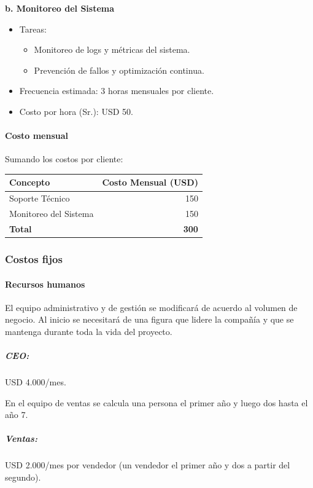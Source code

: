 \textbf{b. Monitoreo del Sistema}
\begin{itemize}
    \item Tareas:
    \begin{itemize}
        \item Monitoreo de logs y métricas del sistema.
        \item Prevención de fallos y optimización continua.
    \end{itemize}
    \item Frecuencia estimada: 3 horas mensuales por cliente.
    \item Costo por hora (Sr.): USD 50.
\end{itemize}

\paragraph{Costo mensual}

Sumando los costos por cliente:

\begin{center}
\begin{tabular}{lr}
\hline
\textbf{Concepto} & \textbf{Costo Mensual (USD)} \\
\hline
Soporte Técnico & 150 \\
Monitoreo del Sistema & 150 \\
\hline
\textbf{Total} & \textbf{300} \\
\hline
\end{tabular}
\end{center}

\subsubsection{Costos fijos}

\paragraph{Recursos humanos}

El equipo administrativo y de gestión se modificará de acuerdo al volumen de negocio. Al inicio se necesitará de una figura que lidere la compañía y que se mantenga durante toda la vida del proyecto.

\subparagraph{CEO:} USD 4.000/mes.

En el equipo de ventas se calcula una persona el primer año y luego dos hasta el año 7.

\subparagraph{Ventas:} USD 2.000/mes por vendedor (un vendedor el primer año y dos a partir del segundo).

